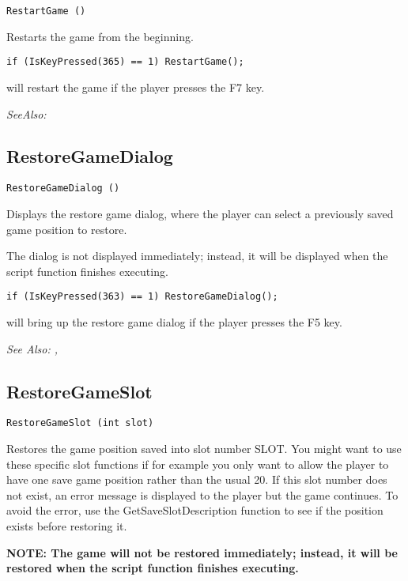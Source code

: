 \begin{verbatim}
RestartGame ()
\end{verbatim}
Restarts the game from the beginning.

\begin{verbatim}
if (IsKeyPressed(365) == 1) RestartGame();
\end{verbatim}
will restart the game if the player presses the F7 key.

\it{SeeAlso:} 


\subsection{RestoreGameDialog}\label{RestoreGameDialog}%

\begin{verbatim}
RestoreGameDialog ()
\end{verbatim}
Displays the restore game dialog, where the player can select a previously
saved game position to restore.

The dialog is not displayed immediately; instead, it will be displayed when
the script function finishes executing.


\begin{verbatim}
if (IsKeyPressed(363) == 1) RestoreGameDialog();
\end{verbatim}
will bring up the restore game dialog if the player presses the F5 key.

\it{See Also:} , 


\subsection{RestoreGameSlot}\label{RestoreGameSlot}%

\begin{verbatim}
RestoreGameSlot (int slot)
\end{verbatim}
Restores the game position saved into slot number SLOT. You might want to
use these specific slot functions if for example you only want to allow the
player to have one save game position rather than the usual 20. If this slot
number does not exist, an error message is displayed to the player but the
game continues. To avoid the error, use the GetSaveSlotDescription function
to see if the position exists before restoring it.

\bf{NOTE:} The game will not be restored immediately; instead, it will be
restored when the script function finishes executing.

